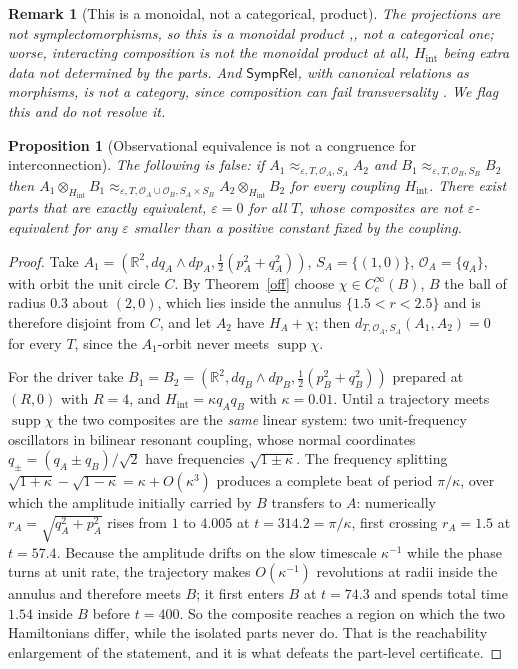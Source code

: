 \documentclass[12pt,a4paper]{article}
\theoremstyle{definition}
\theoremstyle{plain}
\newtheorem{proposition}[definition]{Proposition}
\theoremstyle{commentary}
\newtheorem{remark}[definition]{Remark}
\newcommand{\R}{\mathbb{R}}
\newcommand{\SympRel}{\mathsf{SympRel}}
\newcommand{\Oc}{\mathcal{O}}
\newcommand{\eps}{\varepsilon}
\begin{document}
\begin{remark}[This is a monoidal, not a categorical, product]
\label{mon}
The projections are not symplectomorphisms, so this is a monoidal product \cite[Ch.~XI]{MacLane1998},\cite{BaezStay2011}, not a categorical one; worse, \emph{interacting} composition is not the monoidal product at all, $H_{\mathrm{int}}$ being extra data not determined by the parts. And $\SympRel$, with canonical relations as morphisms, is not a category, since composition can fail transversality \cite{Weinstein2010}. We flag this and do not resolve it.
\end{remark}

\begin{proposition}[Observational equivalence is not a congruence for interconnection]
\label{cong}
The following is false: \emph{if $A_1\approx_{\eps,T,\Oc_A,S_A}A_2$ and $B_1\approx_{\eps,T,\Oc_B,S_B}B_2$ then $A_1\otimes_{H_{\mathrm{int}}}B_1\approx_{\eps,T,\Oc_A\cup\Oc_B,S_A\times S_B}A_2\otimes_{H_{\mathrm{int}}}B_2$ for every coupling $H_{\mathrm{int}}$.} There exist parts that are \emph{exactly} equivalent, $\eps=0$ for all $T$, whose composites are not $\eps$-equivalent for any $\eps$ smaller than a positive constant fixed by the coupling.
\end{proposition}

\begin{proof}
Take $A_1=(\R^2,dq_A\wedge dp_A,\tfrac12(p_A^2+q_A^2))$, $S_A=\{(1,0)\}$, $\Oc_A=\{q_A\}$, with orbit the unit circle $C$. By Theorem~\ref{off} choose $\chi\in C_c^\infty(B)$, $B$ the ball of radius $0.3$ about $(2,0)$, which lies inside the annulus $\{1.5<r<2.5\}$ and is therefore disjoint from $C$, and let $A_2$ have $H_A+\chi$; then $d_{T,\Oc_A,S_A}(A_1,A_2)=0$ for every $T$, since the $A_1$-orbit never meets $\operatorname{supp}\chi$.

For the driver take $B_1=B_2=(\R^2,dq_B\wedge dp_B,\tfrac12(p_B^2+q_B^2))$ prepared at $(R,0)$ with $R=4$, and $H_{\mathrm{int}}=\kappa q_Aq_B$ with $\kappa=0.01$. Until a trajectory meets $\operatorname{supp}\chi$ the two composites are the \emph{same} linear system: two unit-frequency oscillators in bilinear resonant coupling, whose normal coordinates $q_\pm=(q_A\pm q_B)/\sqrt2$ have frequencies $\sqrt{1\pm\kappa}$. The frequency splitting $\sqrt{1+\kappa}-\sqrt{1-\kappa}=\kappa+O(\kappa^3)$ produces a complete beat of period $\pi/\kappa$, over which the amplitude initially carried by $B$ transfers to $A$: numerically $r_A=\sqrt{q_A^2+p_A^2}$ rises from $1$ to $4.005$ at $t=314.2=\pi/\kappa$, first crossing $r_A=1.5$ at $t=57.4$. Because the amplitude drifts on the slow timescale $\kappa^{-1}$ while the phase turns at unit rate, the trajectory makes $O(\kappa^{-1})$ revolutions at radii inside the annulus and therefore meets $B$; it first enters $B$ at $t=74.3$ and spends total time $1.54$ inside $B$ before $t=400$. So the composite reaches a region on which the two Hamiltonians differ, while the isolated parts never do. That is the reachability enlargement of the statement, and it is what defeats the part-level certificate.
\end{proof}
\end{document}
